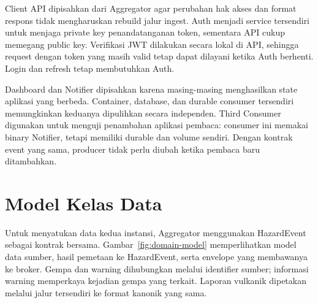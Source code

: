 Client API dipisahkan dari Aggregator agar perubahan hak akses dan format respons tidak mengharuskan rebuild jalur ingest. Auth menjadi service tersendiri untuk menjaga private key penandatanganan token, sementara API cukup memegang public key. Verifikasi JWT dilakukan secara lokal di API, sehingga request dengan token yang masih valid tetap dapat dilayani ketika Auth berhenti. Login dan refresh tetap membutuhkan Auth.

Dashboard dan Notifier dipisahkan karena masing-masing menghasilkan state aplikasi yang berbeda. Container, database, dan durable consumer tersendiri memungkinkan keduanya dipulihkan secara independen. Third Consumer digunakan untuk menguji penambahan aplikasi pembaca: consumer ini memakai binary Notifier, tetapi memiliki durable dan volume sendiri. Dengan kontrak event yang sama, producer tidak perlu diubah ketika pembaca baru ditambahkan.

\clearpage
\section{Model Kelas Data}
Untuk menyatukan data kedua instansi, Aggregator menggunakan HazardEvent sebagai kontrak bersama. Gambar~\ref{fig:domain-model} memperlihatkan model data sumber, hasil pemetaan ke HazardEvent, serta envelope yang membawanya ke broker. Gempa dan warning dihubungkan melalui identifier sumber; informasi warning memperkaya kejadian gempa yang terkait. Laporan vulkanik dipetakan melalui jalur tersendiri ke format kanonik yang sama.

